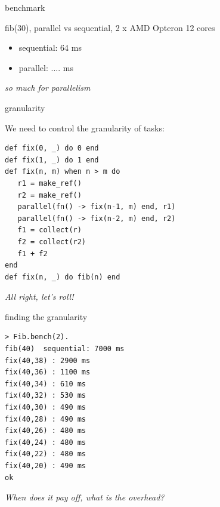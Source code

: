 \begin{frame}{benchmark}

fib(30),  parallel vs sequential, 2 x AMD Opteron 12 cores

\pause\vspace{20pt}

\begin{itemize}
\pause \item sequential: 64 ms 
\pause \item parallel: \pause ....  ms
\end{itemize}

\vspace{20pt}
{\em so much for parallelism}

\end{frame} 

\begin{frame}[fragile]{granularity}

We need to control the granularity of tasks:

 \begin{verbatim}
def fix(0, _) do 0 end
def fix(1, _) do 1 end
def fix(n, m) when n > m do 
   r1 = make_ref()
   r2 = make_ref()
   parallel(fn() -> fix(n-1, m) end, r1)
   parallel(fn() -> fix(n-2, m) end, r2)
   f1 = collect(r)
   f2 = collect(r2)
   f1 + f2
end
def fix(n, _) do fib(n) end
\end{verbatim}

\pause\vspace{20pt}
{\em All right, let's roll!}
\end{frame}

\begin{frame}[fragile]{finding the granularity}

\begin{verbatim}
> Fib.bench(2).
fib(40)  sequential: 7000 ms
fix(40,38) : 2900 ms
fix(40,36) : 1100 ms
fix(40,34) : 610 ms
fix(40,32) : 530 ms
fix(40,30) : 490 ms
fix(40,28) : 490 ms
fix(40,26) : 480 ms
fix(40,24) : 480 ms
fix(40,22) : 480 ms
fix(40,20) : 490 ms
ok
\end{verbatim}

{\em When does it pay off, what is the overhead?}

\end{frame}

